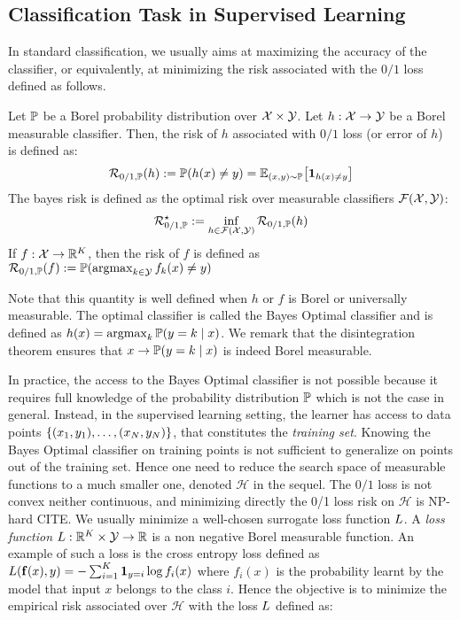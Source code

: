 \subsection{Classification Task in Supervised Learning}


In standard classification, we usually aims at maximizing the accuracy of the classifier, or equivalently, at minimizing the risk associated with the $0/1$ loss defined as follows.

    
\begin{definition} Let $\mathbb{P}$ be a Borel probability distribution over $\mathcal{X}\times\mathcal{Y}$. Let $h:\mathcal{X}\to\mathcal{Y}$ be a Borel measurable classifier. Then, the risk of $h$ associated with $0/1$ loss (or error of $h$) is defined as:
\begin{align}
   \risk_{0/1,\PP}(h):=\PP(h(x)\neq y) = \EE_{(x,y)\sim\PP}\left[\mathbf{1}_{h(x)\neq y}\right]
\end{align}
The bayes risk is defined as the optimal risk over measurable classifiers $\mathcal{F}(\mathcal{X},\mathcal{Y})$:
\begin{align}
    \mathcal{R}^\star_{0/1,\mathbb{P}}:=\inf_{h\in\mathcal{F}(\mathcal{X},\mathcal{Y})}\mathcal{R}_{0/1,\mathbb{P}}(h)
 \end{align}
If $f:\mathcal{X}\to\mathbb{R}^K$, then the risk of $f$ is defined as $\mathcal{R}_{0/1,\mathbb{P}}(f):=\mathbb{P}(\operatorname*{argmax}_{k\in\mathcal{Y}}f_k(x)\neq y)$
\end{definition}

Note that this quantity is well defined when $h$ or $f$ is Borel or universally measurable. The optimal classifier is called the Bayes Optimal classifier and is defined as $h(x) = \operatorname*{argmax}_k\mathbb{P}(y=k\mid x)$. We remark that the disintegration theorem ensures that $x\to \mathbb{P}(y=k\mid x)$ is indeed Borel measurable. 

In practice, the access to the Bayes Optimal classifier is not possible because it requires full knowledge of the probability distribution $\mathbb{P}$ which is not the case in general. Instead, in the supervised learning setting, the learner has access to data points $\{(x_1,y_1),\dots,(x_N,y_N)\}$, that constitutes the \emph{training set}. Knowing the Bayes Optimal classifier on training points is not sufficient to generalize on points out of the training set. Hence one need to reduce the search space of measurable functions to a much smaller one, denoted $\mathcal{H}$ in the sequel. The $0/1$ loss is not convex neither continuous, and minimizing directly the 0/1 loss risk  on $\mathcal{H}$ is  NP-hard CITE. We usually minimize a well-chosen surrogate loss function $L$. A \textit{loss function} $L:\mathbb{R}^K\times\mathcal{Y}\to\mathbb{R}$ is a non negative Borel measurable function. An example of such a loss is the cross entropy loss defined as $L(\mathbf{f}(x),y)=-\sum_{i=1}^K \mathbf{1}_{y=i}\log f_i(x)$
where $f_i(x)$ is the probability learnt by the model that input $x$ belongs to the class $i$. Hence the objective is to minimize the empirical risk associated over $\mathcal{H}$ with the loss $L$  defined as:

